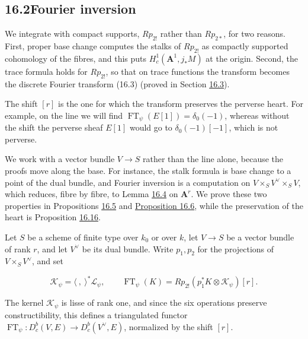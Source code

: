 \documentclass[11pt]{article}
\providecommand{\Dbc}{}\renewcommand{\Dbc}{D^b_c}
\begin{document}
\subsection*{\texorpdfstring{16.2\quad Fourier inversion}{16.2 Fourier inversion}}
\label{bp181}%
\label{bp182}%
We integrate with compact supports, \(Rp_{2!}\) rather than \(Rp_{2*}\), for two reasons. First, proper base change computes the stalks of \(Rp_{2!}\) as compactly supported cohomology of the fibres, and this puts \(H^1_c(\mathbf A^1,j_*M)\) at the origin. Second, the trace formula holds for \(Rp_{2!}\), so that on trace functions the transform becomes the discrete Fourier transform (16.3) (proved in Section \hyperref[bp190]{16.3}).

The shift \([r]\) is the one for which the transform preserves the perverse heart. For example, on the line we will find \(\operatorname{FT}_\psi(E[1])=\delta_0(-1)\), whereas without the shift the perverse sheaf \(E[1]\) would go to \(\delta_0(-1)[-1]\), which is not perverse.

We work with a vector bundle \(V\to S\) rather than the line alone, because the proofs move along the base. For instance, the stalk formula is base change to a point of the dual bundle, and Fourier inversion is a computation on \(V\times_SV^\vee\times_SV\), which reduces, fibre by fibre, to Lemma \hyperref[bp179]{16.4} on \(\mathbf A^r\). We prove these two properties in Propositions \hyperref[bp183]{16.5} and \hyperref[bp185]{Proposition 16.6}, while the preservation of the heart is Proposition \hyperref[bp214]{16.16}.

Let \(S\) be a scheme of finite type over \(k_0\) or over \(k\), let \(V\to S\) be a vector bundle of rank \(r\), and let \(V^\vee\) be its dual bundle. Write \(p_1,p_2\) for the projections of \(V\times_SV^\vee\), and set

\[
\mathcal K_\psi=\langle\ ,\ \rangle^*\mathcal L_\psi,
\qquad
\operatorname{FT}_\psi(K)
=Rp_{2!}(p_1^*K\otimes\mathcal K_\psi)[r].
\tag{16.1}
\]

The kernel \(\mathcal K_\psi\) is lisse of rank one, and since the six operations preserve constructibility, this defines a triangulated functor \(\operatorname{FT}_\psi:\Dbc(V,E)\to\Dbc(V^\vee,E)\), normalized by the shift \([r]\).
\end{document}

